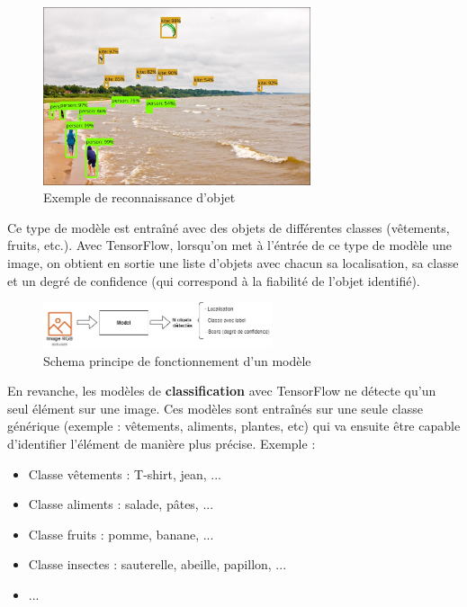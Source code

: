 \documentclass[UTF8]{EPURapport}
\begin{document}
\begin{figure}[h!]
\centering
  \includegraphics[width=0.7\textwidth]{images/object_detection.jpg}
  \caption{Exemple de reconnaissance d'objet}
  \label{fig:objectdetection}
\end{figure}

 Ce type de modèle est entraîné avec des objets de différentes classes (vêtements, fruits, etc.). Avec TensorFlow, lorsqu'on met à l'éntrée de ce type de modèle une image, on obtient en sortie une liste d'objets avec chacun sa localisation, sa classe et un degré de confidence (qui correspond à la fiabilité de l'objet identifié).

\begin{figure}[h!]
\centering
  \includegraphics[width=0.6\textwidth]{images/schema_objectDetection.png}
  \caption{Schema principe de fonctionnement d'un modèle}
  \label{fig:schema_objectdetection}
\end{figure}

En revanche, les modèles de \textbf{classification} avec TensorFlow ne détecte qu'un seul élément sur une image. Ces modèles sont entraînés sur une seule classe générique (exemple : vêtements, aliments, plantes, etc) qui va ensuite être capable d'identifier l'élément de manière plus précise. Exemple : \\

\begin{itemize}
  \item Classe vêtements : T-shirt, jean, ...
  \item Classe aliments : salade, pâtes, ...
  \item Classe fruits : pomme, banane, ...  
  \item Classe insectes : sauterelle, abeille, papillon, ...
  \item  ...
\end{itemize}
\end{document}

